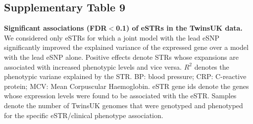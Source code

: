\pagebreak

\subsection{Supplementary Table 9}
\label{tab:estrsuptab9}
\footnotesize
\begin{adjustbox}{width=1\textwidth}
\end{adjustbox}
\normalsize

\textbf{Significant associations (FDR$<$0.1) of eSTRs in the TwinsUK data.}
We considered only eSTRs for which a joint model with the lead eSNP significantly improved the explained variance of the expressed gene over a model with the lead eSNP alone. Positive effects denote STRs whose expansions are associated with increased phenotypic levels and vice versa. $R^2$ denotes the phenotypic variane explained by the STR. BP: blood pressure; CRP: C-reactive protein; MCV: Mean Corpuscular Haemoglobin. eSTR gene ids denote the genes whose expression levels were found to be associated with the eSTR. Samples denote the number of TwinsUK genomes that were genotyped and phenotyped for the specific eSTR/clinical phenotype association.  
\label{table:GWAS} 
